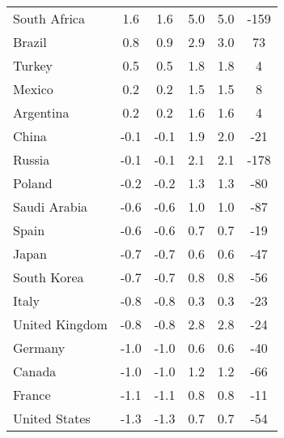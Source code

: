 \begin{tabular}[t]{lccccc}
South Africa & 1.6 & 1.6 & 5.0 & 5.0 & -159\\
Brazil & 0.8 & 0.9 & 2.9 & 3.0 & 73\\
Turkey & 0.5 & 0.5 & 1.8 & 1.8 & 4\\
Mexico & 0.2 & 0.2 & 1.5 & 1.5 & 8\\
Argentina & 0.2 & 0.2 & 1.6 & 1.6 & 4\\
China & -0.1 & -0.1 & 1.9 & 2.0 & -21\\
Russia & -0.1 & -0.1 & 2.1 & 2.1 & -178\\
Poland & -0.2 & -0.2 & 1.3 & 1.3 & -80\\
Saudi Arabia & -0.6 & -0.6 & 1.0 & 1.0 & -87\\
Spain & -0.6 & -0.6 & 0.7 & 0.7 & -19\\
Japan & -0.7 & -0.7 & 0.6 & 0.6 & -47\\
South Korea & -0.7 & -0.7 & 0.8 & 0.8 & -56\\
Italy & -0.8 & -0.8 & 0.3 & 0.3 & -23\\
United Kingdom & -0.8 & -0.8 & 2.8 & 2.8 & -24\\
Germany & -1.0 & -1.0 & 0.6 & 0.6 & -40\\
Canada & -1.0 & -1.0 & 1.2 & 1.2 & -66\\
France & -1.1 & -1.1 & 0.8 & 0.8 & -11\\
United States & -1.3 & -1.3 & 0.7 & 0.7 & -54\\
\bottomrule
\end{tabular}